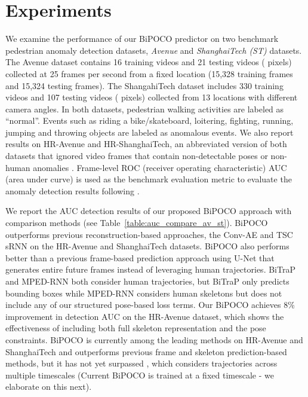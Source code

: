 \documentclass[nohyperref]{article}
\theoremstyle{plain}
\theoremstyle{definition}
\theoremstyle{remark}
\begin{document}
\vspace{-3mm}


\section{Experiments}
\label{sec:experiments}
\vspace{-2mm}
We examine the performance of our BiPOCO predictor on two benchmark pedestrian anomaly detection datasets, \textit{Avenue} \cite{cewu2013} and \textit{ShanghaiTech (ST)} \cite{luo2017revisit} datasets. The Avenue dataset contains 16 training videos and 21 testing videos ( pixels) collected at 25 frames per second from a fixed location (15,328 training frames and 15,324 testing frames). The ShangahiTech dataset includes 330 training videos and 107 testing videos ( pixels) collected from 13 locations with different camera angles. In both datasets, pedestrian walking activities are labeled as ``normal''. Events such as riding a bike/skateboard, loitering, fighting, running, jumping and throwing objects are labeled as anomalous events.  We also report results on HR-Avenue and HR-ShanghaiTech, an abbreviated version of both datasets that ignored video frames that contain  non-detectable poses or non-human anomalies \cite{morais2019learning}. Frame-level ROC (receiver operating characteristic)  AUC (area under curve) is used as the benchmark
evaluation metric to evaluate the anomaly detection results following \cite{hasan2016learning, morais2019learning}.

\vspace{-1mm}

We report the AUC detection results of our proposed BiPOCO approach with comparison methods (see Table~\ref{table:auc_compare_av_st}). BiPOCO outperforms  previous reconstruction-based approaches, the Conv-AE \cite{hasan2016learning} and TSC sRNN \cite{luo2017revisit} on the HR-Avenue and ShanghaiTech datasets. BiPOCO also performs  better than a previous frame-based prediction approach using U-Net \cite{liu2018future} that generates entire future frames instead of leveraging human trajectories. BiTraP \cite{kanu2021leveraging} and MPED-RNN \cite{morais2019learning} both consider human trajectories, but BiTraP only predicts bounding boxes while MPED-RNN considers human skeletons but does not include any of our structured pose-based loss terms. Our BiPOCO achieves 8\% improvement in detection AUC on the HR-Avenue dataset, which shows the effectiveness of including both full skeleton representation  and the pose constraints. BiPOCO  is currently among the leading methods on HR-Avenue and ShanghaiTech and outperforms previous frame and skeleton prediction-based methods, but it has not yet surpassed \cite{rodrigues2020multi}, which considers trajectories across multiple timescales (Current BiPOCO is trained at a fixed timescale - we elaborate on this next).
\end{document}
